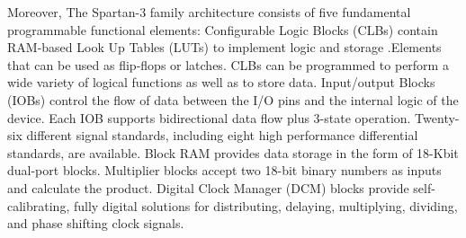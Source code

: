 \documentclass[12pt,a4paper]{article}
\begin{document}
Moreover, The Spartan-3 family architecture consists of five fundamental programmable functional elements: Configurable Logic Blocks (CLBs) contain RAM-based Look Up Tables (LUTs) to implement logic and storage .Elements that can be used as flip-flops or latches. CLBs can be programmed to perform a wide variety of logical functions as well as to store data. Input/output Blocks (IOBs) control the flow of data between the I/O pins and the internal logic of the device. Each IOB supports bidirectional data flow plus 3-state operation. Twenty-six different signal standards, including eight high performance differential standards, are available. Block RAM provides data storage in the form of 18-Kbit dual-port blocks. Multiplier blocks accept two 18-bit binary numbers as inputs and calculate the product. Digital Clock Manager (DCM) blocks provide self-calibrating, fully digital solutions for distributing, delaying, multiplying, dividing, and phase shifting clock signals.\\
\end{document}
